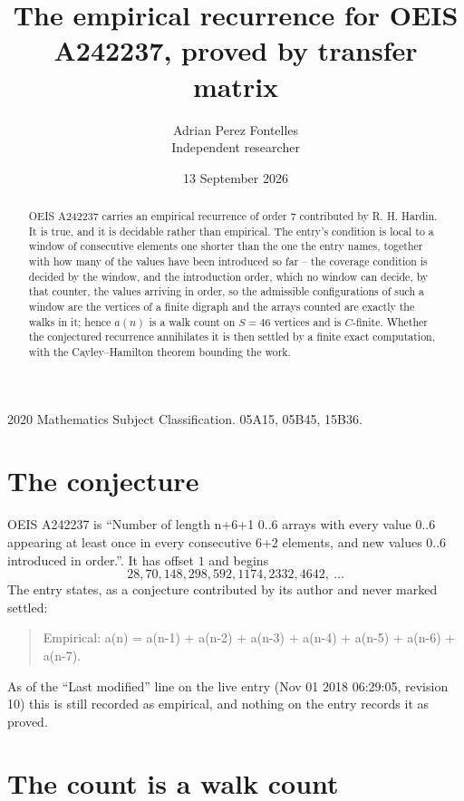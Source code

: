 \documentclass[11pt,a4paper]{article}
\title{The empirical recurrence for OEIS A242237, proved by transfer matrix}
\author{Adrian Perez Fontelles\\ \small Independent researcher}
\date{13 September 2026}
\theoremstyle{plain}
\theoremstyle{definition}
\begin{document}
\maketitle

\begin{abstract}
OEIS A242237 carries an empirical recurrence of order $7$ contributed by R. H. Hardin. It is
true, and it is decidable rather than empirical. The entry's condition is local to a window of consecutive elements one shorter than the one the entry names, together with how many of the values have been introduced so far -- the coverage condition is decided by the window, and the introduction order, which no window can decide, by that counter, the values arriving in order, so
the admissible configurations of such a window are the vertices of a finite digraph and the
arrays counted are exactly the walks in it; hence $a(n)$ is a walk count on $S=46$ vertices
and is $C$-finite. Whether the conjectured recurrence annihilates it is then settled by a
finite exact computation, with the Cayley--Hamilton theorem bounding the work.
\end{abstract}

\noindent\small 2020 Mathematics Subject Classification. 05A15, 05B45, 15B36.\normalsize

\section{The conjecture}

OEIS A242237 is ``Number of length n+6+1 0..6 arrays with every value 0..6 appearing at least once in every consecutive 6+2 elements, and new values 0..6 introduced in order.''. It has offset $1$ and begins
\[
28, 70, 148, 298, 592, 1174, 2332, 4642,\ \dots
\]
The entry states, as a conjecture contributed by its author and never marked settled:
\begin{quote}
Empirical: a(n) = a(n-1) + a(n-2) + a(n-3) + a(n-4) + a(n-5) + a(n-6) + a(n-7).
\end{quote}
As of the ``Last modified'' line on the live entry (Nov 01 2018 06:29:05, revision 10) this is still
recorded as empirical, and nothing on the entry records it as proved.

\section{The count is a walk count}
\end{document}
